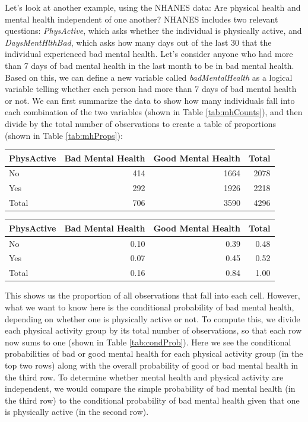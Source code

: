 \documentclass[12pt,]{book}
\theoremstyle{definition}
\theoremstyle{definition}
\theoremstyle{definition}
\theoremstyle{remark}
\begin{document}
Let's look at another example, using the NHANES data: Are physical health and mental health independent of one another? NHANES includes two relevant questions: \emph{PhysActive}, which asks whether the individual is physically active, and \emph{DaysMentHlthBad}, which asks how many days out of the last 30 that the individual experienced bad mental health. Let's consider anyone who had more than 7 days of bad mental health in the last month to be in bad mental health. Based on this, we can define a new variable called \emph{badMentalHealth} as a logical variable telling whether each person had more than 7 days of bad mental health or not. We can first summarize the data to show how many individuals fall into each combination of the two variables (shown in Table \ref{tab:mhCounts}), and then divide by the total number of observations to create a table of proportions (shown in Table \ref{tab:mhProps}):

\begin{tabular}{l|r|r|r}
\hline
PhysActive & Bad Mental Health & Good Mental Health & Total\\
\hline
No & 414 & 1664 & 2078\\
\hline
Yes & 292 & 1926 & 2218\\
\hline
Total & 706 & 3590 & 4296\\
\hline
\end{tabular}

\begin{tabular}{l|r|r|r}
\hline
PhysActive & Bad Mental Health & Good Mental Health & Total\\
\hline
No & 0.10 & 0.39 & 0.48\\
\hline
Yes & 0.07 & 0.45 & 0.52\\
\hline
Total & 0.16 & 0.84 & 1.00\\
\hline
\end{tabular}

This shows us the proportion of all observations that fall into each cell. However, what we want to know here is the conditional probability of bad mental health, depending on whether one is physically active or not. To compute this, we divide each physical activity group by its total number of observations, so that each row now sums to one (shown in Table \ref{tab:condProb}). Here we see the conditional probabilities of bad or good mental health for each physical activity group (in the top two rows) along with the overall probability of good or bad mental health in the third row. To determine whether mental health and physical activity are independent, we would compare the simple probability of bad mental health (in the third row) to the conditional probability of bad mental health given that one is physically active (in the second row).
\end{document}
